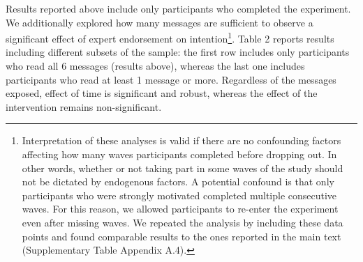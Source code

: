 \documentclass[authordate, empirical]{jote-new-article}
\begin{document}
Results reported above include only participants who completed the experiment. We additionally explored how many messages are sufficient to observe a significant effect of expert endorsement on intention\footnote{ Interpretation of these analyses is valid if there are no confounding factors affecting how many waves participants completed before dropping out. In other words, whether or not taking part in some waves of the study should not be dictated by endogenous factors. A potential confound is that only participants who were strongly motivated completed multiple consecutive waves. For this reason, we allowed participants to re-enter the experiment even after missing waves. We repeated the analysis by including these data points and found comparable results to the ones reported in the main text (Supplementary Table Appendix A.4).}. Table 2 reports results including different subsets of the sample: the first row includes only participants who read all 6 messages (results above), whereas the last one includes participants who read at least 1 message or more. Regardless of the messages exposed, effect of time is significant and robust, whereas the effect of the intervention remains non-significant.
\end{document}
